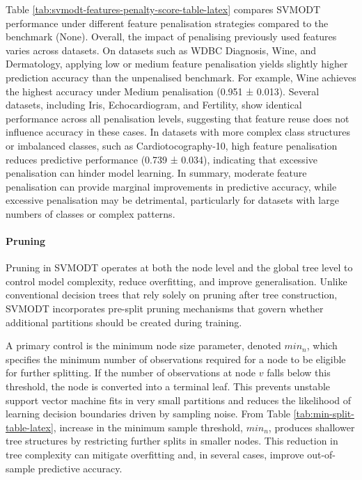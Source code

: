 Table \ref{tab:svmodt-features-penalty-score-table-latex} compares SVMODT performance under different feature penalisation strategies compared to the benchmark (None). Overall, the impact of penalising previously used features varies across datasets. On datasets such as WDBC Diagnosis, Wine, and Dermatology, applying low or medium feature penalisation yields slightly higher prediction accuracy than the unpenalised benchmark. For example, Wine achieves the highest accuracy under Medium penalisation (0.951 ± 0.013). Several datasets, including Iris, Echocardiogram, and Fertility, show identical performance across all penalisation levels, suggesting that feature reuse does not influence accuracy in these cases. In datasets with more complex class structures or imbalanced classes, such as Cardiotocography-10, high feature penalisation reduces predictive performance (0.739 ± 0.034), indicating that excessive penalisation can hinder model learning. In summary, moderate feature penalisation can provide marginal improvements in predictive accuracy, while excessive penalisation may be detrimental, particularly for datasets with large numbers of classes or complex patterns.

\paragraph{Pruning}\label{pruning}

Pruning in SVMODT operates at both the node level and the global tree level to control model complexity, reduce overfitting, and improve generalisation. Unlike conventional decision trees that rely solely on pruning after tree construction, SVMODT incorporates pre-split pruning mechanisms that govern whether additional partitions should be created during training.

A primary control is the minimum node size parameter, denoted \({min_n}\), which specifies the minimum number of observations required for a node to be eligible for further splitting. If the number of observations at node \(v\) falls below this threshold, the node is converted into a terminal leaf. This prevents unstable support vector machine fits in very small partitions and reduces the likelihood of learning decision boundaries driven by sampling noise. From Table \ref{tab:min-split-table-latex}, increase in the minimum sample threshold, \(min_n\), produces shallower tree structures by restricting further splits in smaller nodes. This reduction in tree complexity can mitigate overfitting and, in several cases, improve out-of-sample predictive accuracy.


